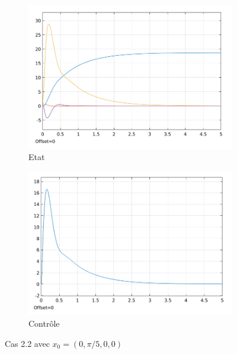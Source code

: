 \documentclass[a4paper]{article}
\begin{document}
                        \begin{figure}[h!]
                                \centering
                                \begin{subfigure}[b]{0.45\textwidth}
                                        \includegraphics[width=\textwidth]{images/courbe_cas_3_2_TP03.png}
                                        \caption{Etat}
                                        \label{fig3.12.1}
                                \end{subfigure}
                                \hspace{30pt}
                                \begin{subfigure}[b]{0.45\textwidth}
                                        \includegraphics[width=\textwidth]{images/controle_cas_3_2_TP03.png}
                                        \caption{Contrôle}
                                        \label{fig3.12.2}
                                \end{subfigure}
                                \caption{Cas 2.2 avec $x_0=(0,\pi/5,0,0)$}
                                \label{fig3.12}
                        \end{figure}
                        \newpage
\end{document}
